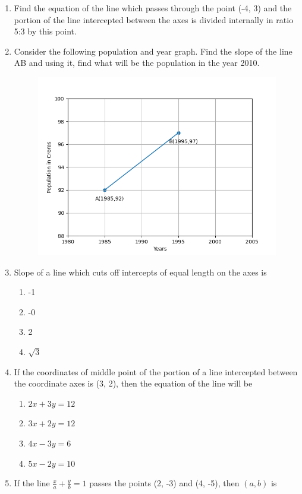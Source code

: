 \begin{enumerate}[label=\thesubsection.\arabic*, ref=\thesubsection.\theenumi]
\item Find the equation of the line which passes through the point (-4, 3) and the portion of the line intercepted between the axes is divided internally in ratio 5:3 by this point.
\item Consider the following population and year graph. Find the slope of the line AB and using it,  find what will be the population in the year 2010.
\\
\begin{figure}[H]
\centering
\includegraphics[width=0.75\columnwidth]{chapters/11/10/1/14/figs/fig.png}
\caption{}
\label{fig:chapters/11/10/1/14/1}
\end{figure}
\solution

\item Slope of a line which cuts off intercepts of equal length on the axes is 
\begin{enumerate}
\item -1
\item -0
\item 2
\item $\sqrt{3}$
\end{enumerate}
\item If the coordinates of middle point of the portion of a line intercepted between the coordinate axes is (3, 2), then the equation of the line will be
\begin{enumerate}
\item $2x+3y=12$
\item $3x+2y=12$
\item $4x-3y=6$
\item $5x-2y=10$
\end{enumerate}
\item If the line $\frac{x}{a}+\frac{y}{b}=1$ passes the points (2, -3) and (4, -5),  then $(a, b)$ is 
\begin{enumerate}

\end{enumerate}
\end{enumerate}
